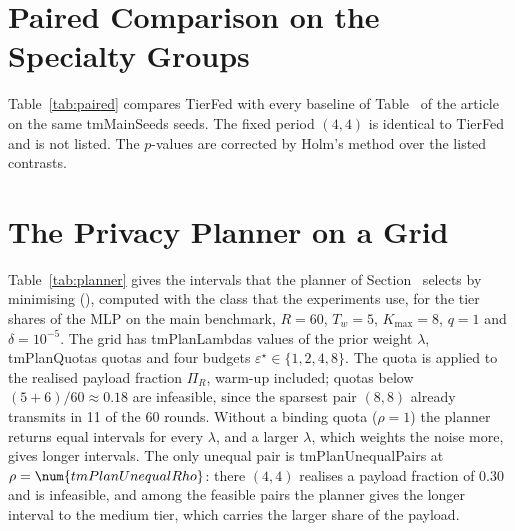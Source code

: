 \documentclass[journal]{IEEEtran}
\newcommand{\tierfed}{TierFed}
\newcommand{\fit}[1]{\sbox\tabbox{#1}\ifdim\wd\tabbox>\linewidth\resizebox{\linewidth}{!}{\usebox\tabbox}\else\usebox\tabbox\fi}
\begin{document}
\begin{table}[t]
\caption{The two primary contrasts under three rules for the reported value, computed from the same runs: mean paired difference in AUROC with its bootstrap 95\% interval. The best uniform period is the one chosen in Table~ of the article}
\label{tab:selection}
\centering\small
\fit{\gen{tm_selection}}
\end{table}

\section{Paired Comparison on the Specialty Groups}
\label{supp:paired}
Table~\ref{tab:paired} compares \tierfed{} with every baseline of Table~ of the article on the same \num{tmMainSeeds} seeds. The fixed period $(4,4)$ is identical to \tierfed{} and is not listed. The $p$-values are corrected by Holm's method over the listed contrasts.

\begin{table}[t]
\caption{Paired comparison of \tierfed{} with each baseline on the specialty groups: difference in AUROC at $\hat r$ with its bootstrap 95\% interval, Holm-corrected Wilcoxon $p$-value, number of seeds on which \tierfed{} is strictly higher, and difference in upload in MB up to $\hat r$ and over 60 rounds}
\label{tab:paired}
\centering\small
\fit{\gen{tm_paired}}
\end{table}

\section{The Privacy Planner on a Grid}
\label{supp:planner}
Table~\ref{tab:planner} gives the intervals that the planner of Section~ selects by minimising (), computed with the class that the experiments use, for the tier shares of the MLP on the main benchmark, $R=60$, $T_w=5$, $K_{\max}=8$, $q=1$ and $\delta=10^{-5}$. The grid has \num{tmPlanLambdas} values of the prior weight $\lambda$, \num{tmPlanQuotas} quotas and four budgets $\varepsilon^\star\in\{1,2,4,8\}$.  The quota is applied to the realised payload fraction $\Pi_R$, warm-up included; quotas below $(5+6)/60\approx0.18$ are infeasible, since the sparsest pair $(8,8)$ already transmits in 11 of the 60 rounds. Without a binding quota ($\rho=1$) the planner returns equal intervals for every $\lambda$, and a larger $\lambda$, which weights the noise more, gives longer intervals. The only unequal pair is \num{tmPlanUnequalPairs} at $\rho=\num{tmPlanUnequalRho}$: there $(4,4)$ realises a payload fraction of 0.30 and is infeasible, and among the feasible pairs the planner gives the longer interval to the medium tier, which carries the larger share of the payload.
\end{document}
